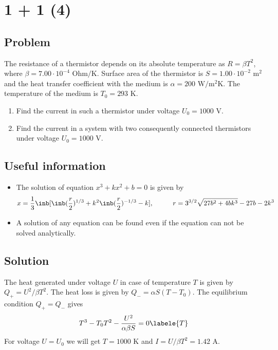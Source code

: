 \section*{1 + 1 (4)}

\subsection*{Problem}
The resistance of a thermistor depends on its absolute temperature as
$R = \beta T^2$, where $\beta = 7.00 \cdot 10^{-4}\text{ Ohm/K}$.
Surface area of the thermistor is $S = 1.00 \cdot 10^{-2} \text{ m}^2$ and
the heat transfer coefficient with the medium is $\alpha = 200 \text{ W/m$^2$K}$.
The temperature of the medium is $T_0 = 293 \text{ K}$.

\begin{enumerate}
    \item Find the current in such a thermistor under voltage $U_0 = 1000 \text{ V}$.
    \item Find the current in a system with two consequently connected thermistors
        under voltage $U_0 = 1000 \text{ V}$.
\end{enumerate}

\subsection*{Useful information}
\begin{itemize}
    \item The solution of equation $x^3 + k x^2 + b = 0$ is given by
        \begin{equation}
            x = \frac{1}{3} \inb[{
                \inb({\frac{r}{2}})^{1/3} +
                k^2 \inb({\frac{r}{2}})^{-1/3} - k}], \hspace{1cm}
            r = 3^{3/2} \sqrt{27 b^2 + 4 b k^3} - 27b - 2 k^3
        \end{equation}
    \item A solution of any equation can be found even if
        the equation can not be solved analytically.
\end{itemize}

\subsection*{Solution}

The heat generated under voltage $U$ in case of temperature $T$
is given by $Q_+ = U^2 / \beta T^2$.
The heat loss is given by $Q_- = \alpha S (T - T_0)$.
The equilibrium condition $Q_+ = Q_-$ gives
\begin{equation}
    T^3 - T_0 T^2 - \frac{U^2}{\alpha \beta S} = 0
    \labele{T}
\end{equation}
For voltage $U = U_0$ we will get
$T = 1000 \text{ K}$ and $I = U / \beta T^2 = 1.42 \text{ A}$.

